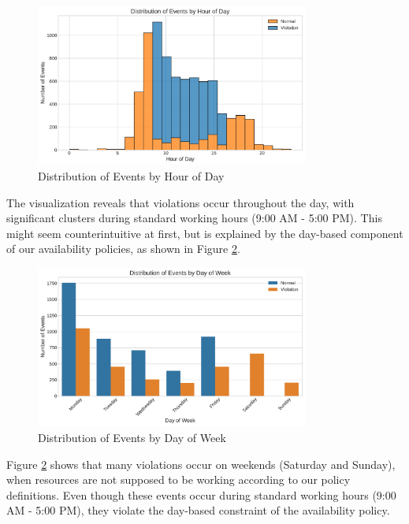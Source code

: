 \begin{figure}[h]
\centering
\includegraphics[width=0.8\textwidth]{paper_sections/events_by_hour_distribution.pdf}
\caption{Distribution of Events by Hour of Day}
\label{fig:events-by-hour}
\end{figure}

The visualization reveals that violations occur throughout the day, with significant clusters during standard working hours (9:00 AM - 5:00 PM). This might seem counterintuitive at first, but is explained by the day-based component of our availability policies, as shown in Figure \ref{fig:events-by-day}.

\begin{figure}[h]
\centering
\includegraphics[width=0.8\textwidth]{paper_sections/events_by_day_distribution.pdf}
\caption{Distribution of Events by Day of Week}
\label{fig:events-by-day}
\end{figure}

Figure \ref{fig:events-by-day} shows that many violations occur on weekends (Saturday and Sunday), when resources are not supposed to be working according to our policy definitions. Even though these events occur during standard working hours (9:00 AM - 5:00 PM), they violate the day-based constraint of the availability policy.


